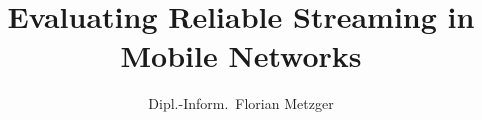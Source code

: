 
\title{Evaluating Reliable Streaming in Mobile Networks}
\author{Dipl.-Inform.~Florian Metzger}
\newcommand{\betreuer}{Univ.-Prof.~Dipl.-Ing.~Dr.~Helmut Hlavacs}
\newcommand{\gutachterA}{Univ.-Prof.~Dipl.-Math.~Dr.~Peter Reichl,~M.A.~St.}
\newcommand{\gutachterB}{Prof.~Dr.-Ing.~Phuoc Tran-Gia}

\newcommand{\dissertationsgebiet}{Informatik}
\newcommand{\studienkennzahl}{A 786 880}
\newcommand{\akademischergrad}{Doktor der technischen Wissenschaften (Dr.~tech.)}
